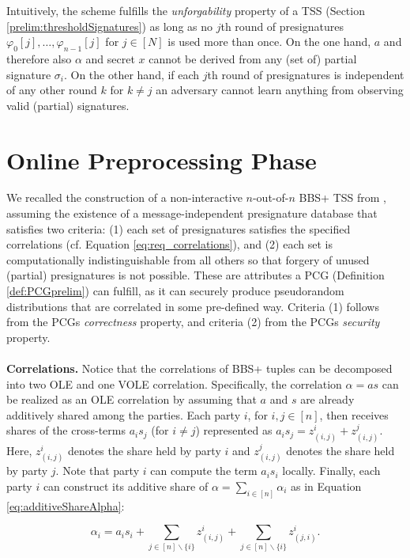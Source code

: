 Intuitively, the scheme fulfills the \textit{unforgability} property of a TSS (Section \ref{prelim:thresholdSignatures}) as long as no $j$th round of presignatures $\varphi_{0}[j], \ldots, \varphi_{n-1}[j]$ for $j \in [N]$  is used more than once. On the one hand, $a$ and therefore also $\alpha$ and secret $x$ cannot be derived from any (set of) partial signature $\sigma_i$. On the other hand, if each $j$th round of presignatures is independent of any other round $k$ for $k \neq j$ an adversary cannot learn anything from observing valid (partial) signatures.

\section{Online Preprocessing Phase}
We recalled the construction of a non-interactive $n$-out-of-$n$ BBS+ TSS from \cite{cryptoeprint:2023/1076}, assuming the existence of a message-independent presignature database that satisfies two criteria: (1) each set of presignatures satisfies the specified correlations (cf. Equation \ref{eq:req_correlations}), and (2) each set is computationally indistinguishable from all others so that forgery of unused (partial) presignatures is not possible. These are attributes a PCG (Definition \ref{def:PCGprelim}) can fulfill, as it can securely produce pseudorandom distributions that are correlated in some pre-defined way. Criteria (1) follows from the PCGs \textit{correctness} property, and criteria (2) from the PCGs \textit{security} property.
\\\\
\textbf{Correlations.} Notice that the correlations of BBS+ tuples can be decomposed into two OLE and one VOLE correlation. Specifically, the correlation $\alpha = as$ can be realized as an OLE correlation by assuming that $a$ and $s$ are already additively shared among the parties. Each party $i$, for $i, j \in [n]$, then receives shares of the cross-terms $a_is_j$ (for $i \neq j$) represented as  $a_is_j = z_{(i,j)}^i+z_{(i,j)}^j$. Here, $z_{(i,j)}^i$ denotes the share held by party $i$ and $z_{(i,j)}^j$ denotes the share held by party $j$. Note that party $i$ can compute the term $a_is_i$ locally. Finally, each party $i$ can construct its additive share of $\alpha = \sum_{i\in [n]}\alpha_i$ as in Equation \ref{eq:additiveShareAlpha}:

\begin{equation}
  \alpha_i=a_is_i + \sum_{j \in [n]\backslash \{i\}}{z_{(i,j)}^i} + \sum_{j \in [n]\backslash \{i\}}z_{(j,i)}^i.
  \label{eq:additiveShareAlpha}
\end{equation}

